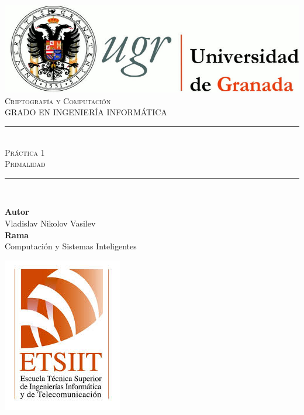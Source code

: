 \documentclass[11pt,a4paper]{article}
\newcommand{\asignatura}{Criptografía y Computación}
\newcommand{\autor}{Vladislav Nikolov Vasilev}
\newcommand{\titulo}{Práctica 1}
\newcommand{\subtitulo}{Primalidad}
\newcommand{\rama}{Computación y Sistemas Inteligentes}
\begin{document}

\begin{titlepage}

\begin{minipage}{\textwidth}

\centering

\includegraphics[scale=0.3]{img/logo_ugr.jpg}\\[1cm]

\textsc{\Large \asignatura{}\\[0.2cm]}
\textsc{GRADO EN INGENIERÍA INFORMÁTICA}\\[1cm]

\noindent\rule[-1ex]{\textwidth}{1pt}\\[1.5ex]
\textsc{{\Huge \titulo\\[0.5ex]}}
\textsc{{\Large \subtitulo\\}}
\noindent\rule[-1ex]{\textwidth}{2pt}\\[3.5ex]

\end{minipage}

\vspace{0.7cm}

\begin{minipage}{\textwidth}

\centering

\textbf{Autor}\\ {\autor{}}\\[2.5ex]
\textbf{Rama}\\ {\rama}\\[2.5ex]
\vspace{0.3cm}

\includegraphics[scale=0.3]{img/etsiit.jpeg}


\end{minipage}
\end{titlepage}
\end{document}
